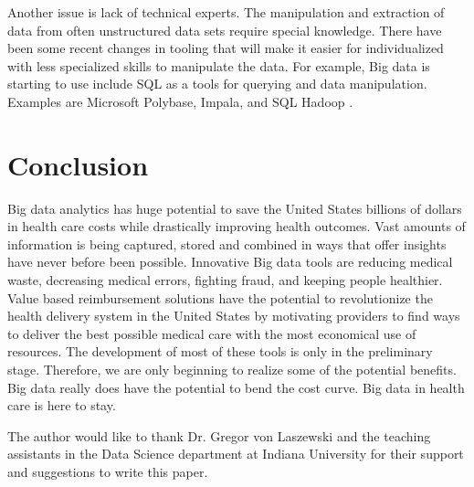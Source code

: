 \documentclass[sigconf]{acmart}
\begin{document}
Another issue is lack of technical experts. The manipulation and extraction of data from often unstructured data sets require special knowledge. There have been some recent changes in tooling that will make it easier for individualized with less specialized skills to manipulate the data. For example, Big data is starting to use include SQL as a tools for querying and data manipulation. Examples are Microsoft Polybase, Impala, and SQL Hadoop \cite{www-google-HlthCat}.  
 
 

\section{Conclusion}
Big data analytics has huge potential to save the United States billions of dollars in health care costs while drastically improving health outcomes.  Vast amounts of information is being captured, stored and combined in ways that offer insights have never before been possible.  Innovative Big data tools are reducing medical waste, decreasing medical errors, fighting fraud, and keeping people healthier. Value based reimbursement solutions have the potential to revolutionize the health delivery system in the United States by motivating providers to find ways to deliver the best possible medical care with the most economical use of resources.  The development of most of these tools is only in the preliminary stage. Therefore, we are only beginning to realize some of the potential benefits. Big data really does have the potential to bend the cost curve. Big data in health care is here to stay.  







\begin{acks}

  The author would like to thank Dr. Gregor von Laszewski and the teaching assistants in the Data Science department at Indiana University for their support and suggestions to write this paper.

\end{acks}




 
\end{document}
